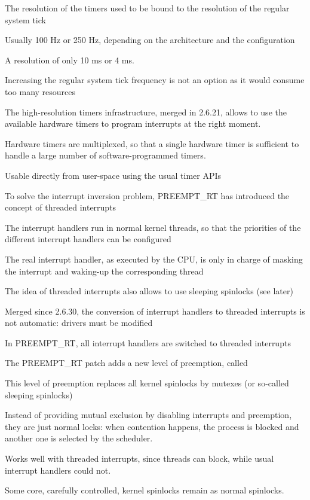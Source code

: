   \startitemize
  \item The resolution of the timers used to be bound to the
    resolution of the regular system tick
    \startitemize
    \item Usually 100 Hz or 250 Hz, depending on the architecture and
      the configuration
    \item A resolution of only 10 ms or 4 ms.
    \item Increasing the regular system tick frequency is not an
      option as it would consume too many resources
    \stopitemize
  \item The high-resolution timers infrastructure, merged in 2.6.21,
    allows to use the available hardware timers to program interrupts
    at the right moment.
    \startitemize
    \item Hardware timers are multiplexed, so that a single hardware
      timer is sufficient to handle a large number of
      software-programmed timers.
    \item Usable directly from user-space using the usual timer APIs
    \stopitemize
  \stopitemize

  \startitemize
  \item To solve the interrupt inversion problem, PREEMPT\_RT has
    introduced the concept of threaded interrupts
  \item The interrupt handlers run in normal kernel threads, so that
    the priorities of the different interrupt handlers can be
    configured
  \item The real interrupt handler, as executed by the CPU, is only in
    charge of masking the interrupt and waking-up the corresponding
    thread
  \item The idea of threaded interrupts also allows to use sleeping
    spinlocks (see later)
  \item Merged since 2.6.30, the conversion of interrupt handlers to
    threaded interrupts is not automatic: drivers must be modified
  \item In PREEMPT\_RT, all interrupt handlers are switched to
    threaded interrupts
  \stopitemize


  \startitemize
  \item The PREEMPT\_RT patch adds a new level of preemption, called
  \item This level of preemption replaces all kernel spinlocks by
    mutexes (or so-called sleeping spinlocks)
    \startitemize
    \item Instead of providing mutual exclusion by disabling
      interrupts and preemption, they are just normal locks: when
      contention happens, the process is blocked and another one is
      selected by the scheduler.
    \item Works well with threaded interrupts, since threads can
      block, while usual interrupt handlers could not.
    \item Some core, carefully controlled, kernel spinlocks remain as
      normal spinlocks.
    \stopitemize
  \stopitemize

